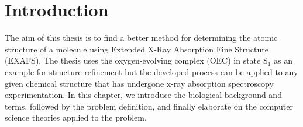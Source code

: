 \chapter{Introduction}

The aim of this thesis is to find a better method for determining the atomic structure of a molecule using Extended X-Ray Absorption Fine Structure (EXAFS). The thesis uses the oxygen-evolving complex (OEC) in state S$_{1}$ as an example for structure refinement but the developed process can be applied to any given chemical structure that has undergone x-ray absorption spectroscopy experimentation. In this chapter, we introduce the biological background and terms, followed by the problem definition, and finally elaborate on the computer science theories applied to the problem.





